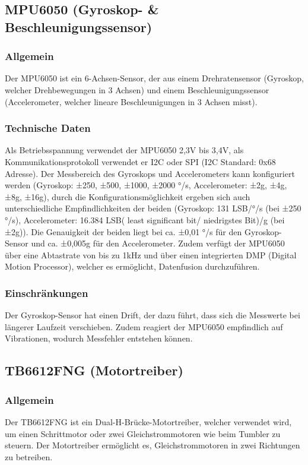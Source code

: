 \subsection{MPU6050 (Gyroskop- \& Beschleunigungssensor)}
%
\subsubsection{Allgemein}
Der MPU6050 ist ein 6-Achsen-Sensor, der aus einem Drehratensensor (Gyroskop, welcher Drehbewegungen in 3 Achsen) und 
einem Beschleunigungssensor (Accelerometer, welcher lineare Beschleunigungen in 3 Achsen misst).
\subsubsection{Technische Daten}
Als Betriebsspannung verwendet der MPU6050 2,3V bis 3,4V, als Kommunikationsprotokoll verwendet er I2C oder SPI (I2C Standard: 0x68 Adresse). 
Der Messbereich des Gyroskops und Accelerometers kann konfiguriert werden (Gyroskop:  ±250, ±500, ±1000, ±2000 °/s, Accelerometer: ±2g, ±4g, ±8g, ±16g), 
durch die Konfigurationsmöglichkeit ergeben sich auch unterschiedliche Empfindlichkeiten der beiden (Gyroskop: 131 LSB/°/s (bei ±250 °/s), 
Accelerometer: 16.384 LSB( least significant bit/ niedrigstes Bit)/g (bei ±2g)).  
Die Genauigkeit der beiden liegt bei ca. ±0,01 °/s für den Gyroskop-Sensor und ca. ±0,005g für den Accelerometer. 
Zudem verfügt der MPU6050 über eine Abtastrate von bis zu 1kHz und über einen integrierten DMP (Digital Motion Processor), welcher es ermöglicht, Datenfusion durchzuführen.
\subsubsection{Einschränkungen}
Der Gyroskop-Sensor hat einen Drift, der dazu führt, dass sich die Messwerte bei längerer Laufzeit verschieben. 
Zudem reagiert der MPU6050 empfindlich auf Vibrationen, wodurch Messfehler entstehen können.
%
\subsection{TB6612FNG (Motortreiber)}
%
\subsubsection{Allgemein}
Der TB6612FNG ist ein Dual-H-Brücke-Motortreiber, welcher verwendet wird, um einen Schrittmotor oder zwei Gleichstrommotoren wie beim Tumbler zu steuern. 
Der Motortreiber ermöglicht es, Gleichstrommotoren in zwei Richtungen zu betreiben.
